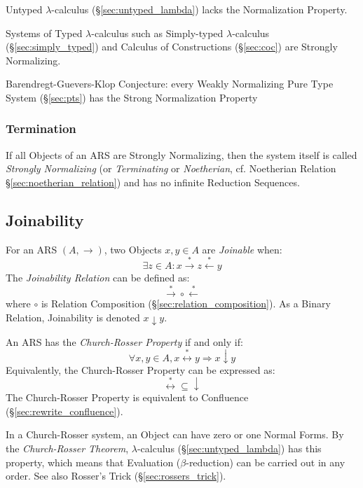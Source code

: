 Untyped $\lambda$-calculus (\S\ref{sec:untyped_lambda}) lacks the
Normalization Property.

Systems of Typed $\lambda$-calculus such as Simply-typed
$\lambda$-calculus (\S\ref{sec:simply_typed}) and Calculus of
Constructions (\S\ref{sec:coc}) are Strongly Normalizing.

Barendregt-Guevers-Klop Conjecture: every Weakly Normalizing Pure Type
System (\S\ref{sec:pts}) has the Strong Normalization Property



\subsubsection{Termination}\label{sec:rewrite_termination}

If all Objects of an ARS are Strongly Normalizing, then the system
itself is called \emph{Strongly Normalizing} (or \emph{Terminating} or
\emph{Noetherian}, cf. Noetherian Relation
\S\ref{sec:noetherian_relation}) and has no infinite Reduction
Sequences.



\subsection{Joinability}\label{sec:rewrite_join}

For an ARS $(A, \rightarrow)$, two Objects $x,y\in A$ are
\emph{Joinable} when:
\[
  \exists z \in A :
  x \stackrel{*}\rightarrow z \stackrel{*}\leftarrow y
\]
The \emph{Joinability Relation} can be defined as:
\[
  \stackrel{*}\rightarrow \circ \stackrel{*}\leftarrow
\]
where $\circ$ is Relation Composition
(\S\ref{sec:relation_composition}). As a Binary Relation, Joinability
is denoted $x \downarrow y$.

An ARS has the \emph{Church-Rosser Property} if and only if:
\[
  \forall x,y \in A, x \stackrel{*}\leftrightarrow y
  \Rightarrow x \downarrow y
\]
Equivalently, the Church-Rosser Property can be expressed as:
\[
  \stackrel{*}\leftrightarrow \subseteq \downarrow
\]
The Church-Rosser Property is equivalent to Confluence
(\S\ref{sec:rewrite_confluence}).

In a Church-Rosser system, an Object can have zero or one Normal
Forms. By the \emph{Church-Rosser Theorem}, $\lambda$-calculus
(\S\ref{sec:untyped_lambda}) has this property, which means that
Evaluation ($\beta$-reduction) can be carried out in any order. See
also Rosser's Trick (\S\ref{sec:rossers_trick}).



